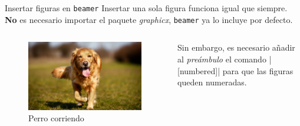 \documentclass{beamer}
\begin{document}
    \begin{frame}[fragile]{Insertar figuras en \texttt{beamer}}
        \justifying
        Insertar una sola figura funciona igual que siempre. \textbf{No}
        es necesario importar el paquete \emph{graphicx}, \texttt{beamer}
        ya lo incluye por defecto. \\ [3ex]
        \begin{columns}
            \begin{column}{0.5\textwidth}
                \begin{figure}
                    \centering
                    \includegraphics[height=0.2\paperheight]{perro.jpg}
                    \caption{Perro corriendo}
                    \label{fig:perro}
                \end{figure}
            \end{column}
            \begin{column}{0.5\textwidth}
                Sin embargo, es necesario añadir al \emph{preámbulo} el comando
                {\scriptsize {}|[numbered]|}
                para que las figuras queden numeradas.
            \end{column}
        \end{columns}

    \end{frame}
\end{document}
